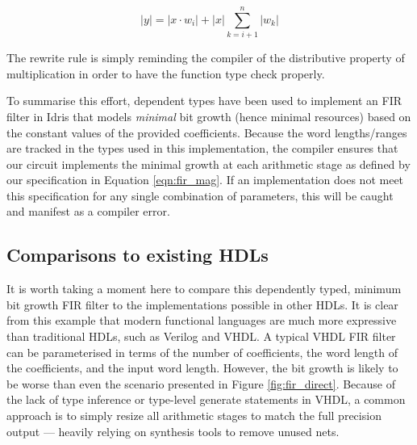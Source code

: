 \documentclass[conference]{IEEEtran}
\begin{document}
\begin{equation}
|y| = |x\cdot w_i|+|x|\sum_{k=i+1}^{n} |w_k|
\end{equation}

The rewrite rule is simply reminding the compiler of the distributive property
of multiplication in order to have the function type check properly.

To summarise this effort, dependent types have been used to implement an FIR
filter in Idris that models \emph{minimal} bit growth (hence minimal resources)
based on the constant values of the provided coefficients. Because the word
lengths/ranges are tracked in the types used in this implementation, the
compiler ensures that our circuit implements the minimal growth at each
arithmetic stage as defined by our specification in Equation \ref{eqn:fir_mag}.
If an implementation does not meet this specification for any single combination
of parameters, this will be caught and manifest as a compiler error.


\subsection{Comparisons to existing HDLs}


It is worth taking a moment here to compare this dependently typed, minimum bit
growth FIR filter to the implementations possible in other HDLs. It is clear
from this example that modern functional languages are much more expressive than
traditional HDLs, such as Verilog and VHDL. A typical VHDL FIR filter can be
parameterised in terms of the number of coefficients, the word length of the
coefficients, and the input word length. However, the bit growth is likely to be
worse than even the scenario presented in Figure \ref{fig:fir_direct}. Because
of the lack of type inference or type-level generate statements in VHDL, a
common approach is to simply resize all arithmetic stages to match the full
precision output --- heavily relying on synthesis tools to remove unused nets.
\end{document}
